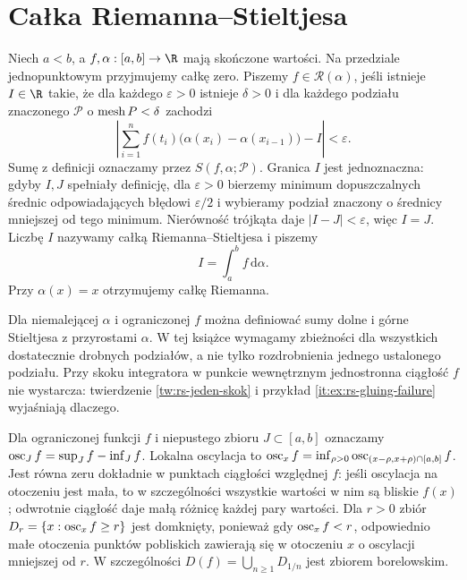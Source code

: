 \section{Całka Riemanna--Stieltjesa}
\begin{definicja}\label{it:def:rs-integral}
Niech $a<b$, a $f,\alpha:[a,b]\to\R$ mają skończone wartości. Na przedziale jednopunktowym przyjmujemy całkę zero. Piszemy $f\in\mathcal R(\alpha)$, jeśli istnieje $I\in\R$ takie, że dla każdego $\varepsilon>0$ istnieje $\delta>0$ i dla każdego podziału znaczonego $\mathcal P$ o $\operatorname{mesh} P<\delta$ zachodzi
\[
\left|\sum_{i=1}^n f(t_i)
 \bigl(\alpha(x_i)-\alpha(x_{i-1})\bigr)-I\right|
 <\varepsilon.
\]
Sumę z definicji oznaczamy przez $S(f,\alpha;\mathcal P)$. Granica $I$ jest jednoznaczna: gdyby $I,J$ spełniały definicję, dla $\varepsilon>0$ bierzemy minimum dopuszczalnych średnic odpowiadających błędowi $\varepsilon/2$ i wybieramy podział znaczony o średnicy mniejszej od tego minimum. Nierówność trójkąta daje $|I-J|<\varepsilon$, więc $I=J$. Liczbę $I$ nazywamy całką Riemanna--Stieltjesa i piszemy
\[
 I=\int_a^b f\,\mathrm d\alpha.
\]
Przy $\alpha(x)=x$ otrzymujemy całkę Riemanna.
\end{definicja}
\begin{uwaga}[Rozszerzenie]
Dla niemalejącej $\alpha$ i ograniczonej $f$ można definiować sumy dolne i górne Stieltjesa z przyrostami $\alpha$. W tej książce wymagamy zbieżności dla wszystkich dostatecznie drobnych podziałów, a nie tylko rozdrobnienia jednego ustalonego podziału. Przy skoku integratora w punkcie wewnętrznym jednostronna ciągłość $f$ nie wystarcza: twierdzenie \ref{tw:rs-jeden-skok} i przykład \ref{it:ex:rs-gluing-failure} wyjaśniają dlaczego.
\end{uwaga}
Dla ograniczonej funkcji $f$ i niepustego zbioru $J\subset[a,b]$ oznaczamy $\operatorname{osc}_J f=\sup_J f-\inf_J f$. Lokalna oscylacja to $\operatorname{osc}_x f=\inf_{\rho>0}\operatorname{osc}_{(x-\rho,x+\rho)\cap[a,b]}f$. Jest równa zeru dokładnie w punktach ciągłości względnej $f$: jeśli oscylacja na otoczeniu jest mała, to w szczególności wszystkie wartości w nim są bliskie $f(x)$; odwrotnie ciągłość daje małą różnicę każdej pary wartości. Dla $r>0$ zbiór $D_r=\{x:\operatorname{osc}_x f\ge r\}$ jest domknięty, ponieważ gdy $\operatorname{osc}_x f<r$, odpowiednio małe otoczenia punktów pobliskich zawierają się w otoczeniu $x$ o oscylacji mniejszej od $r$. W szczególności $D(f)=\bigcup_{n\ge1}D_{1/n}$ jest zbiorem borelowskim.

